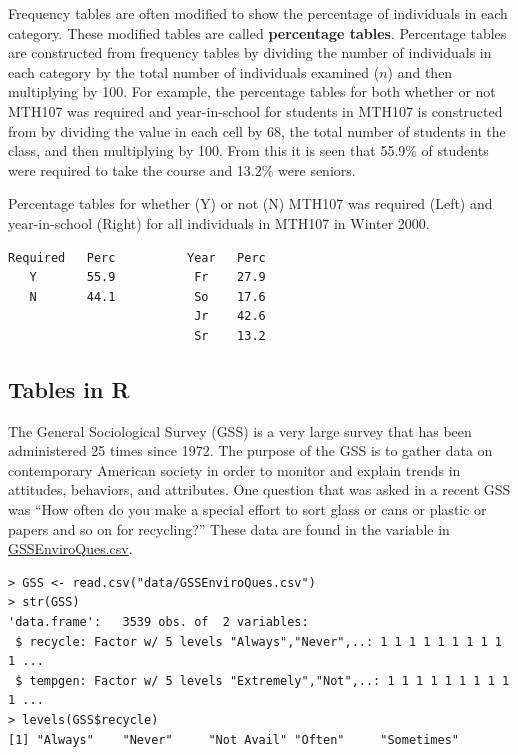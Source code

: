 \documentclass[10pt,openany]{book}\usepackage[]{graphicx}\usepackage[]{color}
\makeatletter
\newenvironment{kframe}{%
 \def\at@end@of@kframe{}%
 \ifinner\ifhmode%
  \def\at@end@of@kframe{\end{minipage}}%
  \begin{minipage}{\columnwidth}%
 \fi\fi%
 \def\FrameCommand##1{\hskip\@totalleftmargin \hskip-\fboxsep
 \colorbox{shadecolor}{##1}\hskip-\fboxsep
     \hskip-\linewidth \hskip-\@totalleftmargin \hskip\columnwidth}%
 \MakeFramed {\advance\hsize-\width
   \@totalleftmargin\z@ \linewidth\hsize
   \@setminipage}}%
 {\par\unskip\endMakeFramed%
 \at@end@of@kframe}
\newenvironment{knitrout}{}{} %
\makeatother
\begin{document}
Frequency tables are often modified to show the percentage of individuals in each category.  These modified tables are called \textbf{percentage tables}.  Percentage tables are constructed from frequency tables by dividing the number of individuals in each category by the total number of individuals examined ($n$) and then multiplying by 100.  For example, the percentage tables for both whether or not MTH107 was required and year-in-school  for students in MTH107 is constructed from  by dividing the value in each cell by 68, the total number of students in the class, and then multiplying by 100.  From this it is seen that 55.9\% of students were required to take the course and 13.2\% were seniors.

\begin{table}[htbp]
  \caption{Percentage tables for whether (Y) or not (N) MTH107 was required (Left) and year-in-school (Right) for all individuals in MTH107 in Winter 2000.}
  \label{tab:Mth107Prop}
  \centering
  \begin{Verbatim}[xleftmargin=5mm]
Required   Perc          Year   Perc
   Y       55.9           Fr    27.9
   N       44.1           So    17.6
                          Jr    42.6
                          Sr    13.2
  \end{Verbatim}
\end{table}

\vspace{-12pt}

\subsection{Tables in R}
The General Sociological Survey (GSS) is a very large survey that has been administered 25 times since 1972.  The purpose of the GSS is to gather data on contemporary American society in order to monitor and explain trends in attitudes, behaviors, and attributes.  One question that was asked in a recent GSS was ``How often do you make a special effort to sort glass or cans or plastic or papers and so on for recycling?''  These data are found in the  variable in \href{https://raw.githubusercontent.com/droglenc/NCData/master/GSSEnviroQues.csv}{GSSEnviroQues.csv}.
\begin{knitrout}
\color{fgcolor}\begin{kframe}
\begin{verbatim}
> GSS <- read.csv("data/GSSEnviroQues.csv")
> str(GSS)
'data.frame':	3539 obs. of  2 variables:
 $ recycle: Factor w/ 5 levels "Always","Never",..: 1 1 1 1 1 1 1 1 1 1 ...
 $ tempgen: Factor w/ 5 levels "Extremely","Not",..: 1 1 1 1 1 1 1 1 1 1 ...
> levels(GSS$recycle)
[1] "Always"    "Never"     "Not Avail" "Often"     "Sometimes"
\end{verbatim}
\end{kframe}
\end{knitrout}
\end{document}
